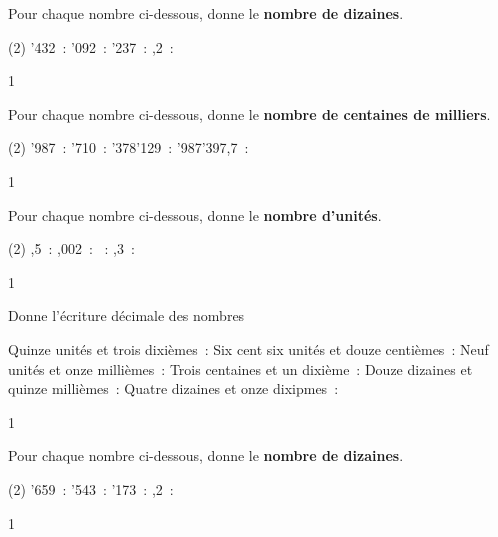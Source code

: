 \documentclass[a4paper,11pt]{report}
\begin{document}
\begin{exop}{
Pour chaque nombre ci-dessous, donne le {\bf nombre de dizaines}.
\begin{tasks}[after-item-skip = 0.5em](2)
'432~: \hrulefill
{}'092~: \hrulefill
{}'237~: \hrulefill
{},2~: \hrulefill
\end{tasks}
}{1}\end{exop}
\begin{exop}{
Pour chaque nombre ci-dessous, donne le {\bf nombre de centaines de milliers}.
\begin{tasks}[after-item-skip = 0.5em](2)
'987~: \hrulefill
{}'710~: \hrulefill
{}'378'129~: \hrulefill
{}'987'397,7~: \hrulefill
\end{tasks}
}{1}\end{exop}
\begin{exop}{
Pour chaque nombre ci-dessous, donne le {\bf nombre d'unités}.
\begin{tasks}[after-item-skip = 0.5em](2)
,5~: \hrulefill
{},002~: \hrulefill
{}~: \hrulefill
{},3~: \hrulefill
\end{tasks}
}{1}\end{exop}




\begin{exop}{
Donne l'écriture décimale des nombres
\begin{tasks}[before-skip=-0.7em]
\task Quinze unités et trois dixièmes~: \hrulefill
\task Six cent six unités et douze centièmes~: \hrulefill
\task Neuf unités et onze millièmes~: \hrulefill
\task Trois centaines et un dixième~: \hrulefill
\task Douze dizaines et quinze millièmes~: \hrulefill
\task Quatre dizaines et onze dixipmes~: \hrulefill
\end{tasks}
}{1}\end{exop}



\begin{exop}{
Pour chaque nombre ci-dessous, donne le {\bf nombre de dizaines}.
\begin{tasks}[before-skip=-0.7em](2)
'659~: \hrulefill
{}'543~: \hrulefill
{}'173~: \hrulefill
{},2~: \hrulefill
\end{tasks}
}{1}\end{exop}
\end{document}
